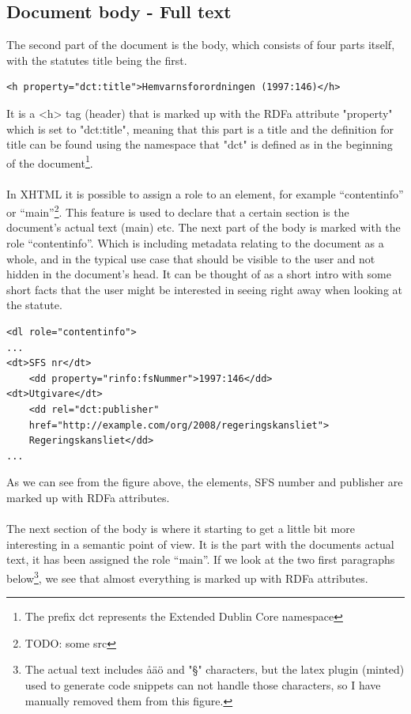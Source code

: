 \subsection{Document body - Full text}
The second part of the document is the body, which consists of four parts itself, with the statutes title being the first.\\
\begin{verbatim}
<h property="dct:title">Hemvarnsforordningen (1997:146)</h>
\end{verbatim}
\linebreak
It is a <h> tag (header) that is marked up with the RDFa attribute "property" which is set to "dct:title", meaning that this part is a title and the definition for title can be found using the namespace that "dct" is defined as in the beginning of the document\footnote{The prefix dct represents the Extended Dublin Core namespace}.\\\\
In XHTML it is possible to assign a role to an element, for example “contentinfo” or “main”\footnote{TODO: some src}. This feature is used to declare that a certain section is the document’s actual text (main) etc. The next part of the body is marked with the role “contentinfo”. Which is including metadata relating to the document as a whole, and in the typical use case that should be visible to the user and not hidden in the document’s head. It can be thought of as a short intro with some short facts that the user might be interested in seeing right away when looking at the statute.\\
\begin{verbatim}
<dl role="contentinfo">
...
<dt>SFS nr</dt>
    <dd property="rinfo:fsNummer">1997:146</dd>
<dt>Utgivare</dt>
    <dd rel="dct:publisher" 
	href="http://example.com/org/2008/regeringskansliet">
	Regeringskansliet</dd>
...
\end{verbatim}
\linebreak
\newline
As we can see from the figure above, the elements, SFS number and publisher are marked up with RDFa attributes.\\\\
The next section of the body is where it starting to get a little bit more interesting in a semantic point of view. It is the part with the documents actual text, it has been assigned the role “main”. If we look at the two first paragraphs below\footnote{The actual text includes åäö and "§" characters, but the latex plugin (minted) used to generate code snippets can not handle those characters, so I have manually removed them from this figure.}, we see that almost everything is marked up with RDFa attributes.\\
